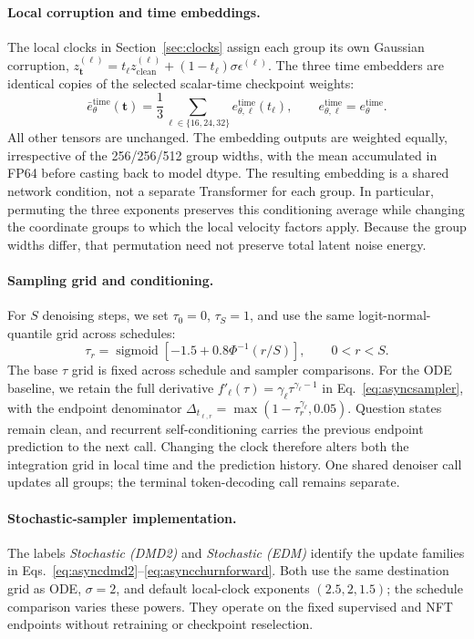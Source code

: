 \documentclass[11pt,letterpaper]{article}
\begin{document}
\paragraph{Local corruption and time embeddings.}
The local clocks in Section~\ref{sec:clocks} assign each group its own Gaussian corruption, $z_{\bm t}^{(\ell)}=t_\ell z_{\mathrm{clean}}^{(\ell)}+(1-t_\ell)\sigma\epsilon^{(\ell)}$. The three time embedders are identical copies of the selected scalar-time checkpoint weights:
\begin{equation}
 \bar e_\theta^{\mathrm{time}}(\bm t)
 =\frac{1}{3}\sum_{\ell\in\{16,24,32\}}e_{\theta,\ell}^{\mathrm{time}}(t_\ell),
 \qquad e_{\theta,\ell}^{\mathrm{time}}=e_\theta^{\mathrm{time}}.
 \label{eq:asynctimeembedding}
\end{equation}
All other tensors are unchanged. The embedding outputs are weighted equally, irrespective of the 256/256/512 group widths, with the mean accumulated in FP64 before casting back to model dtype. The resulting embedding is a shared network condition, not a separate Transformer for each group. In particular, permuting the three exponents preserves this conditioning average while changing the coordinate groups to which the local velocity factors apply. Because the group widths differ, that permutation need not preserve total latent noise energy.

\paragraph{Sampling grid and conditioning.}
For $S$ denoising steps, we set $\tau_0=0$, $\tau_S=1$, and use the same logit-normal-quantile grid across schedules:
\begin{equation}
 \tau_r=\operatorname{sigmoid}\!\left[-1.5+0.8\Phi^{-1}(r/S)\right],
 \qquad 0<r<S.
\end{equation}
The base $\tau$ grid is fixed across schedule and sampler comparisons. For the ODE baseline, we retain the full derivative $f'_\ell(\tau)=\gamma_\ell\tau^{\gamma_\ell-1}$ in Eq.~\eqref{eq:asyncsampler}, with the endpoint denominator $\Delta_{t_{\ell,r}}=\max(1-\tau_r^{\gamma_\ell},0.05)$. Question states remain clean, and recurrent self-conditioning carries the previous endpoint prediction to the next call. Changing the clock therefore alters both the integration grid in local time and the prediction history. One shared denoiser call updates all groups; the terminal token-decoding call remains separate.

\paragraph{Stochastic-sampler implementation.}
\label{app:samplerimplementation}
The labels \emph{Stochastic (DMD2)} and \emph{Stochastic (EDM)} identify the update families in Eqs.~\eqref{eq:asyncdmd2}--\eqref{eq:asyncchurnforward}. Both use the same destination grid as ODE, $\sigma=2$, and default local-clock exponents $(2.5,2,1.5)$; the schedule comparison varies these powers. They operate on the fixed supervised and NFT endpoints without retraining or checkpoint reselection.
\end{document}
